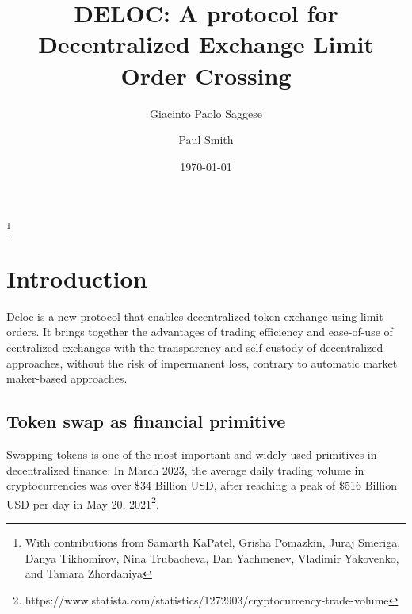 \documentclass[11pt, reqno]{amsart}
\theoremstyle{definition}
\theoremstyle{remark}
\begin{document}
\title{DELOC: A protocol for Decentralized Exchange Limit Order Crossing}

\author{Giacinto Paolo Saggese}
\author{Paul Smith}

\thanks{With contributions from
	Samarth KaPatel,
	Grisha Pomazkin,
	Juraj Smeriga,
	Danya Tikhomirov,
	Nina Trubacheva,
	Dan Yachmenev,
	Vladimir Yakovenko,
	and
	Tamara Zhordaniya}

\date{\today}

\maketitle

\tableofcontents


\section{Introduction}


Deloc is a new protocol that enables decentralized token exchange using limit
orders. It brings together the advantages of trading efficiency and ease-of-use
of centralized exchanges with the transparency and self-custody of
decentralized approaches, without the risk of impermanent loss, contrary to
automatic market maker-based approaches.

\subsection{Token swap as financial primitive}
Swapping tokens is one of the most important and widely used primitives in
decentralized finance.
In March 2023, the average daily trading volume in cryptocurrencies was over
\$34 Billion USD, after reaching a peak of \$516 Billion USD per day in May 20,
2021\footnote{https://www.statista.com/statistics/1272903/cryptocurrency-trade-volume}.

\end{document}
